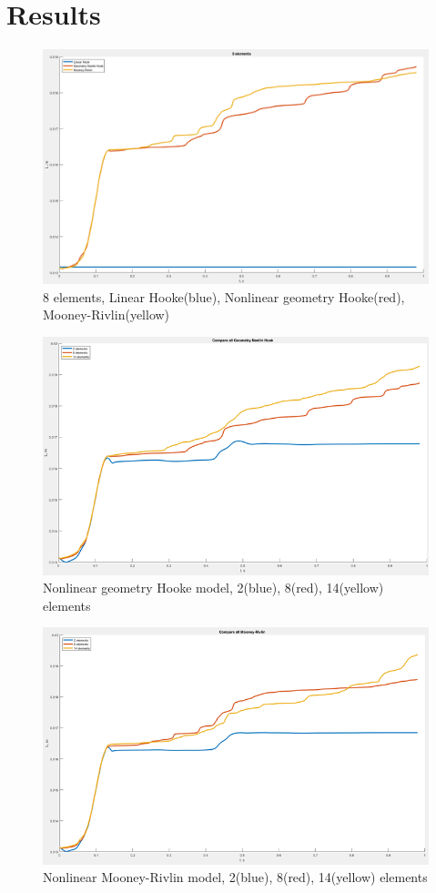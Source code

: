 \section*{Results}

\begin{figure}[H]
    \centering
    \includegraphics[width=\columnwidth]{./fig/comparePhMods.png}
    \caption{8 elements, Linear Hooke(blue), Nonlinear geometry Hooke(red),
     Mooney-Rivlin(yellow)}
    \label{fig:MT}
\end{figure}
\newpage
\begin{figure}[H]
    \centering
    \includegraphics[width=\columnwidth]{./fig/geomNon.png}
    \caption{Nonlinear geometry Hooke model, 2(blue), 8(red), 14(yellow) elements}
    \label{fig:MT}
\end{figure}
\newpage

\begin{figure}[H]
    \centering
    \includegraphics[width=\columnwidth]{./fig/mooneyRivlin.png}
    \caption{Nonlinear Mooney-Rivlin model, 2(blue), 8(red), 14(yellow) elements}
    \label{fig:MT}
\end{figure}
\newpage
